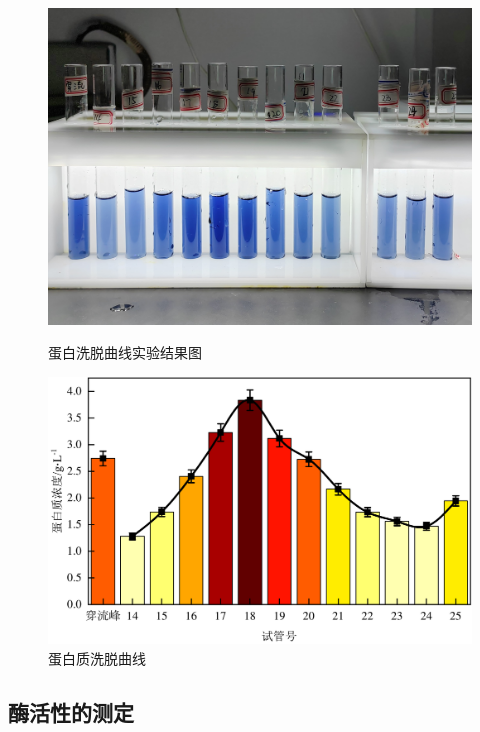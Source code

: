 \begin{figure}[H]
    \begin{minipage}[t]{0.47\textwidth}
        \includegraphics[width = \textwidth]{figure/1124/Pro_Curve.jpg}
        \caption{蛋白洗脱曲线实验结果图}
        \label{fig:Pro_Curve_result}
    \end{minipage}
    \begin{minipage}[t]{0.52\textwidth}
        \includegraphics[width = \textwidth]{figure/1124/Pro_Curve.pdf}
        \caption{蛋白质洗脱曲线}
        \label{fig:Pro_Curve}
    \end{minipage}
\end{figure}

\subsection{酶活性的测定}


